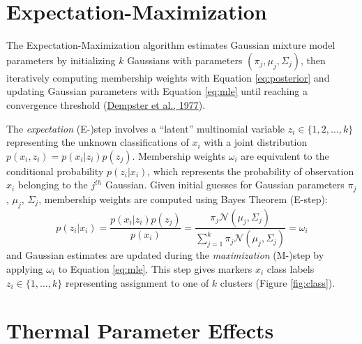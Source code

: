\hypertarget{expectation-maximization}{%
\section{Expectation-Maximization}\label{expectation-maximization}}

The Expectation-Maximization algorithm estimates Gaussian mixture model parameters by initializing \(k\) Gaussians with parameters \((\pi_j, \mu_j, \Sigma_j)\), then iteratively computing membership weights with Equation \eqref{eq:posterior} and updating Gaussian parameters with Equation \eqref{eq:mle} until reaching a convergence threshold (\protect\hyperlink{ref-dempster1977}{Dempster et al., 1977}).

The \emph{expectation} (E-)step involves a ``latent'' multinomial variable \(z_{i} \in \{1, 2, \dots, k\}\) representing the unknown classifications of \(x_i\) with a joint distribution \(p(x_i,z_{i}) = p(x_i | z_{i})p(z_{j})\). Membership weights \(\omega_{i}\) are equivalent to the conditional probability \(p(z_{i} | x_i)\), which represents the probability of observation \(x_i\) belonging to the \(j^{th}\) Gaussian. Given initial guesses for Gaussian parameters \(\pi_j\), \(\mu_j\), \(\Sigma_j\), membership weights are computed using Bayes Theorem (E-step):
\begin{equation}
  p(z_{i} | x_i) = \frac{p(x_i | z_{i})p(z_{j})}{p(x_i)} = \frac{\pi_j \mathcal{N}(\mu_j, \Sigma_j)}{\sum_{j=1}^k \pi_j \mathcal{N}(\mu_j, \Sigma_j)} = \omega_{i}
  \label{eq:posterior}
\end{equation}
and Gaussian estimates are updated during the \emph{maximization} (M-)step by applying \(\omega_{i}\) to Equation \eqref{eq:mle}. This step gives markers \(x_i\) class labels \(z_i \in \{1, \dots, k\}\) representing assignment to one of \(k\) clusters (Figure \ref{fig:class}).

\hypertarget{thermal-parameter-effects}{%
\section{Thermal Parameter Effects}\label{thermal-parameter-effects}}



